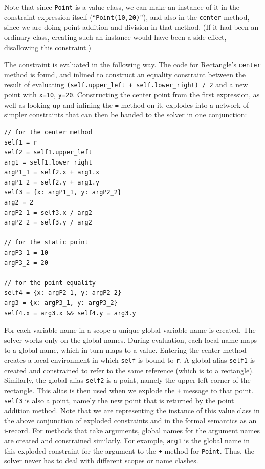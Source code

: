 \documentclass{article}
\begin{document}
Note that since \verb|Point| is a value class, we can make an instance
of it in the constraint expression itself (``\verb|Point(10,20)|''),
and also in the \verb|center| method, since we are doing point
addition and division in that method.  (If it had been an ordinary
class, creating such an instance would have been a side effect,
disallowing this constraint.)

The constraint is evaluated in the following way.  The code for
Rectangle's \verb|center| method is found, and inlined to construct an
equality constraint between the result of evaluating
\verb|(self.upper_left + self.lower_right) / 2| and a new point with
\verb|x=10|, \verb|y=20|. Constructing the center point from the first
expression, as well as looking up and inlining the \verb|=| method on
it, explodes into a network of simpler constraints that can then be
handed to the solver in one conjunction:
\begin{verbatim}
// for the center method
self1 = r
self2 = self1.upper_left
arg1 = self1.lower_right
argP1_1 = self2.x + arg1.x
argP1_2 = self2.y + arg1.y
self3 = {x: argP1_1, y: argP2_2}
arg2 = 2
argP2_1 = self3.x / arg2
argP2_2 = self3.y / arg2

// for the static point
argP3_1 = 10
argP3_2 = 20

// for the point equality
self4 = {x: argP2_1, y: argP2_2}
arg3 = {x: argP3_1, y: argP3_2}
self4.x = arg3.x && self4.y = arg3.y
\end{verbatim}

For each variable name in a scope a unique global variable name is
created.  The solver works only on the global names. During
evaluation, each local name maps to a global name, which in turn maps
to a value.  Entering the center method creates a local environment in
which \verb|self| is bound to \verb|r|\@.  A global alias \verb|self1|
is created and constrained to refer to the same reference (which is to
a rectangle).  Similarly, the global alias \verb|self2| is a point,
namely the upper left corner of the rectangle.  This alias is then
used when we explode the \verb|+| message to that point.  \verb|self3|
is also a point, namely the new point that is returned by the point
addition method.  Note that we are representing the instance of this
value class in the above conjunction of exploded constraints and in
the formal semantics as an i-record.  For methods that
take arguments, global names for the argument names are created and
constrained similarly.  For example, \verb|arg1| is the global name in
this exploded constraint for the argument to the \verb|+| method for
\verb|Point|. Thus, the solver never has to deal with different scopes
or name clashes.
\end{document}
